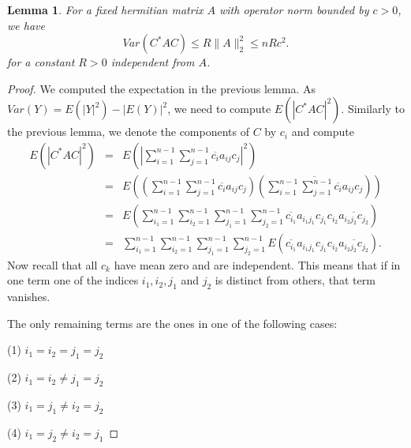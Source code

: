 \documentclass[12pt,a4paper,leqno]{report}
\theoremstyle{plain}
\newtheorem{lem}[equation]{Lemma}
\theoremstyle{definition}
\theoremstyle{remark}
\begin{document}
\begin{lem}
For a fixed hermitian matrix $A$ with operator norm bounded by $c>0$, we have
\begin{equation*}
Var(C^* A C) \leq R \| A \|_2^2 \leq n R c^2.
\end{equation*}
for a constant $R>0$ independent from $A$.
\end{lem}

\begin{proof}
We computed the expectation in the previous lemma. As $Var(Y) = E(|Y|^2)-|E(Y)|^2$, we need to compute $E(|C^* A C|^2)$. Similarly to the previous lemma, we denote the components of $C$ by $c_i$ and compute
\begin{eqnarray*}
E(|C^* A C|^2) & = & E(|\sum_{i=1}^{n-1} \sum_{j=1}^{n-1} \overline{c_i} a_{ij} c_j|^2)\\
& = & E((\sum_{i=1}^{n-1} \sum_{j=1}^{n-1} \overline{c_i} a_{ij} c_j)
(\overline{\sum_{i=1}^{n-1} \sum_{j=1}^{n-1} \overline{c_i} a_{ij} c_j}))\\
& = & E (\sum_{i_1=1}^{n-1}\sum_{i_2=1}^{n-1}
\sum_{j_1=1}^{n-1}\sum_{j_2=1}^{n-1} 
\overline{c_{i_1}} a_{i_1j_1} c_{j_1}c_{i_2} \overline{a_{i_2j_2} c_{j_2}})\\
& = & \sum_{i_1=1}^{n-1}\sum_{i_2=1}^{n-1}
\sum_{j_1=1}^{n-1}\sum_{j_2=1}^{n-1} 
E(\overline{c_{i_1}} a_{i_1j_1} c_{j_1}c_{i_2} \overline{a_{i_2j_2} c_{j_2}}).
\end{eqnarray*}
Now recall that all $c_k$ have mean zero and are independent. This means that if in one term one of the indices $i_1, i_2, j_1$ and $j_2$ is distinct from others, that term vanishes.

The only remaining terms are the ones in one of the following cases:

(1) $i_1 = i_2 = j_1 = j_2$

(2) $i_1=i_2 \neq j_1=j_2$

(3) $i_1 = j_1 \neq i_2 = j_2$

(4) $i_1 = j_2 \neq i_2 = j_1$


\end{proof}
\end{document}
